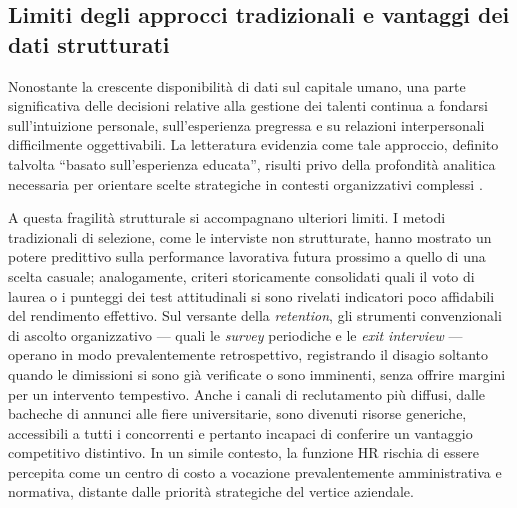 \subsection{Limiti degli approcci tradizionali e vantaggi dei dati strutturati}

Nonostante la crescente disponibilità di dati sul capitale umano, una parte significativa delle decisioni relative alla gestione dei talenti continua a fondarsi sull'intuizione personale, sull'esperienza pregressa e su relazioni interpersonali difficilmente oggettivabili. La letteratura evidenzia come tale approccio, definito talvolta ``basato sull'esperienza educata'', risulti privo della profondità analitica necessaria per orientare scelte strategiche in contesti organizzativi complessi \cite{Isson_Harriott_2016}.

A questa fragilità strutturale si accompagnano ulteriori limiti. I metodi tradizionali di selezione, come le interviste non strutturate, hanno mostrato un potere predittivo sulla performance lavorativa futura prossimo a quello di una scelta casuale; analogamente, criteri storicamente consolidati quali il voto di laurea o i punteggi dei test attitudinali si sono rivelati indicatori poco affidabili del rendimento effettivo. Sul versante della \textit{retention}, gli strumenti convenzionali di ascolto organizzativo --- quali le \textit{survey} periodiche e le \textit{exit interview} --- operano in modo prevalentemente retrospettivo, registrando il disagio soltanto quando le dimissioni si sono già verificate o sono imminenti, senza offrire margini per un intervento tempestivo. Anche i canali di reclutamento più diffusi, dalle bacheche di annunci alle fiere universitarie, sono divenuti risorse generiche, accessibili a tutti i concorrenti e pertanto incapaci di conferire un vantaggio competitivo distintivo. In un simile contesto, la funzione HR rischia di essere percepita come un centro di costo a vocazione prevalentemente amministrativa e normativa, distante dalle priorità strategiche del vertice aziendale.

